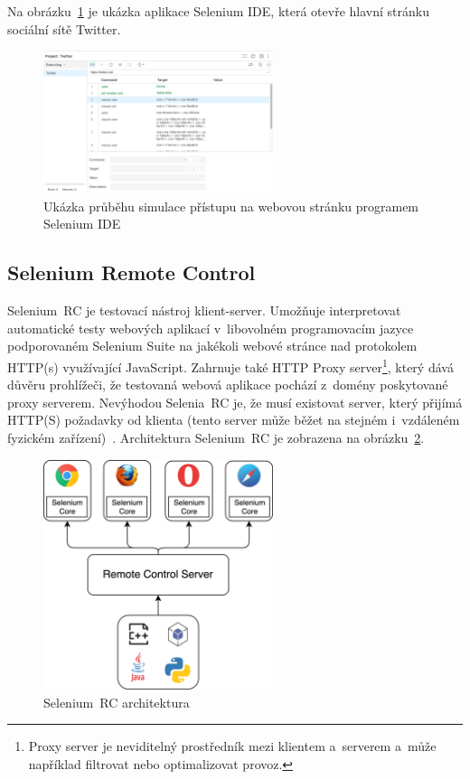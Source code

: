 Na obrázku~\ref{img:selenium_IDE} je ukázka aplikace Selenium IDE, která otevře hlavní stránku sociální sítě Twitter.

\begin{figure}[hbt]
	\centering
	\includegraphics[width=0.6\textwidth]{images/selenium_IDE.png}
	\caption{Ukázka průběhu simulace přístupu na webovou stránku programem Selenium IDE}
	\label{img:selenium_IDE}
\end{figure}

\subsection*{Selenium Remote Control}
Selenium~RC je testovací nástroj klient-server. Umožňuje interpretovat automatické testy webových aplikací v~libovolném programovacím jazyce podporovaném Selenium Suite na jakékoli webové stránce nad protokolem HTTP(s) využívající JavaScript. Zahrnuje také HTTP Proxy server\footnote{Proxy server je neviditelný prostředník mezi klientem a~serverem a~může například filtrovat nebo optimalizovat provoz.}, který dává důvěru prohlížeči, že testovaná webová aplikace pochází z~domény poskytované proxy serverem. Nevýhodou Selenia~RC je, že musí existovat server, který přijímá HTTP(S) požadavky od klienta (tento server může běžet na stejném i~vzdáleném fyzickém zařízení)~\cite{bib:selenium_tool_suite, bib:selenium_grid}. Architektura Selenium~RC je zobrazena na obrázku~\ref{img:selenium_remote_control}.

\begin{figure}[hbt]
	\centering
	\includegraphics[width=0.6\textwidth]{images/selenium_remote_control.png}
	\caption{Selenium~RC architektura}
	\label{img:selenium_remote_control}
\end{figure}

